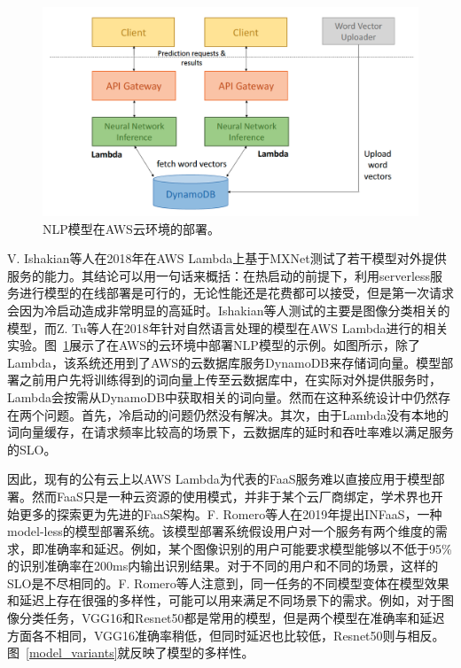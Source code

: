 \begin{figure}[h]
    \centerline{\includegraphics[width=\textwidth]{figures/nlp-serving-arch.png}}
    \caption{NLP模型在AWS云环境的部署。}
    \label{nlp_serving_arch}
\end{figure}

V. Ishakian等人\parencite{ishakian2018serving}在2018年在AWS Lambda上基于MXNet测试了若干模型对外提供服务的能力。其结论可以用一句话来概括：在热启动的前提下，利用serverless服务进行模型的在线部署是可行的，无论性能还是花费都可以接受，但是第一次请求会因为冷启动造成非常明显的高延时。Ishakian等人测试的主要是图像分类相关的模型，而Z. Tu等人\parencite{tu2018pay}在2018年针对自然语言处理的模型在AWS Lambda进行的相关实验。图~\ref{nlp_serving_arch}展示了在AWS的云环境中部署NLP模型的示例。如图所示，除了Lambda，该系统还用到了AWS的云数据库服务DynamoDB来存储词向量。模型部署之前用户先将训练得到的词向量上传至云数据库中，在实际对外提供服务时，Lambda会按需从DynamoDB中获取相关的词向量。然而在这种系统设计中仍然存在两个问题。首先，冷启动的问题仍然没有解决。其次，由于Lambda没有本地的词向量缓存，在请求频率比较高的场景下，云数据库的延时和吞吐率难以满足服务的SLO。

因此，现有的公有云上以AWS Lambda为代表的FaaS服务难以直接应用于模型部署。然而FaaS只是一种云资源的使用模式，并非于某个云厂商绑定，学术界也开始更多的探索更为先进的FaaS架构。F. Romero\parencite{romero2019infaas}等人在2019年提出INFaaS，一种model-less的模型部署系统。该模型部署系统假设用户对一个服务有两个维度的需求，即准确率和延迟。例如，某个图像识别的用户可能要求模型能够以不低于95\%的识别准确率在200ms内输出识别结果。对于不同的用户和不同的场景，这样的SLO是不尽相同的。F. Romero等人注意到，同一任务的不同模型变体在模型效果和延迟上存在很强的多样性，可能可以用来满足不同场景下的需求。例如，对于图像分类任务，VGG16和Resnet50都是常用的模型，但是两个模型在准确率和延迟方面各不相同，VGG16准确率稍低，但同时延迟也比较低，Resnet50则与相反。图~\ref{model_variants}就反映了模型的多样性。

